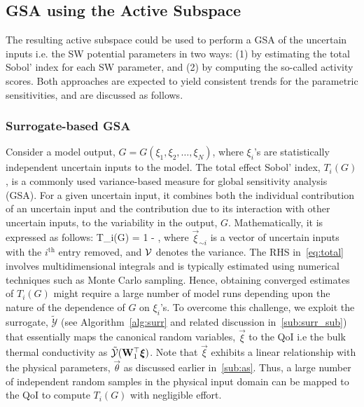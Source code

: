 \subsection{GSA using the Active Subspace}
\label{sub:scores} 

The resulting active subspace could be used to perform a GSA of the uncertain inputs i.e. the SW potential
parameters in two ways: (1) by estimating the total Sobol' index for each SW parameter, and (2) by computing
the so-called activity scores. Both approaches are expected to yield consistent trends for the parametric 
sensitivities, and are discussed as follows. 

\subsubsection{Surrogate-based GSA}
\label{subsub:gsa_surr}

Consider a model output, $G= G(\xi_1,\xi_2,\ldots,\xi_N)$, where $\xi_i$'s are statistically independent uncertain
inputs to the model. The total effect Sobol' index, $T_i(G)$, is a commonly used 
variance-based measure for global sensitivity 
analysis (GSA). For a given uncertain input, it combines both the individual contribution of an uncertain input and the
contribution due to its interaction with other uncertain inputs, to the variability in the output, $G$. Mathematically, it is 
expressed as follows:
%
\be
T_i(G) = 1 - 
,
\label{eq:total}
\ee
%
where $\vec{\xi}_{\sim i}$ is a vector of uncertain inputs with the  $i^\text{th}$ entry removed, and $\mathcal{V}$ denotes the 
variance. The RHS in~\eqref{eq:total} involves multidimensional integrals and is typically estimated using numerical
techniques such as Monte Carlo sampling. Hence, obtaining converged estimates of $T_i(G)$ might require a large 
number of model runs depending upon the nature of the dependence of $G$ on $\xi_i$'s. To overcome this challenge,
we exploit the surrogate, $\tilde{\mathcal{Y}}$ (see Algorithm~\ref{alg:surr} and related discussion in~\ref{sub:surr_sub})
that essentially maps the canonical random variables, $\vec{\xi}$ to the QoI i.e the bulk thermal conductivity as 
$\tilde{\mathcal{Y}}(\mat{W}_1^\top\vec{\xi})$. Note that $\vec{\xi}$ exhibits a linear
relationship with the physical parameters, $\vec{\theta}$ as discussed earlier in~\ref{sub:as}.
Thus, a large number of
independent random samples in the physical input domain can be mapped to the QoI to compute $T_i(G)$
with negligible effort. 

